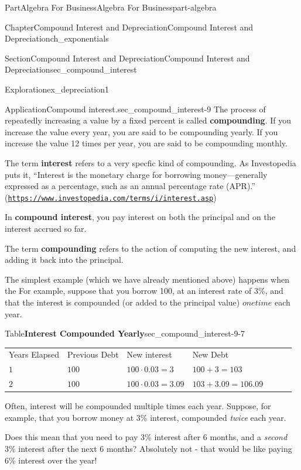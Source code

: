\documentclass[oneside,10pt,]{tufte-book}
\newcommand{\tabularfont}{\relax}
\newcommand{\terminology}[1]{\textbf{#1}}
\numberwithin{equation}{chapter}
\newcommand{\hrulethin}  {\noalign{\hrule height 0.04em}}
\begin{document}
\begin{partptx}{Part}{Algebra For Business}{}{Algebra For Business}{}{}{part-algebra}
\begin{chapterptx}{Chapter}{Compound Interest and Depreciation}{}{Compound Interest and Depreciation}{}{}{ch_exponentials}
\begin{sectionptx}{Section}{Compound Interest and Depreciation}{}{Compound Interest and Depreciation}{}{}{sec_compound_interest}
\begin{exploration}{Exploration}{}{ex_depreciation1}
\begin{enumerate}[font=\bfseries,label=(\alph*),ref=\alph*]
\begin{image}{0.25}{0.5}{0.25}{}
{\begin{tikzpicture}
\end{tikzpicture}
}%
\end{image}%
\end{enumerate}%
\end{exploration}%
\begin{insight}{Application}{Compound interest.}{sec_compound_interest-9}%
The process of repeatedly increasing a value by a fixed percent is called \terminology{compounding}. If you increase the value every year, you are said to be compounding yearly. If you increase the value 12 times per year, you are said to be compounding monthly.%
\par
The term \terminology{interest} refers to a very specfic kind of compounding.  As Investopedia puts it, ``Interest is the monetary charge for borrowing money—generally expressed as a percentage, such as an annual percentage rate (APR).'' (\href{https://www.investopedia.com/terms/i/interest.asp}{\nolinkurl{https://www.investopedia.com/terms/i/interest.asp}})%
\par
In \terminology{compound interest}, you pay interest on both the principal and on the interest accrued so far.%
\par
The term \terminology{compounding} refers to the action of computing the new interest, and adding it back into the principal.%
\par
The simplest example (which we have already mentioned above) happens when the For example, suppose that you borrow \textdollar{}100, at an interest rate of 3\%, and that the interest is compounded (or added to the principal value) \(one time\) each year.%
\begin{tableptx}{Table}{\textbf{Interest Compounded Yearly}}{sec_compound_interest-9-7}{}%
\centering%
{\tabularfont%
\begin{tabular}{lAlAlAl}
Years Elapsed&Previous Debt&New interest&New Debt\tabularnewline\hrulethin
\(1\)&\(100\)&\(100\cdot 0.03=3\)&\(100+3=103\)\tabularnewline\hrulethin
\(2\)&\(100\)&\(100\cdot 0.03=3.09\)&\(103+3.09=106.09\)
\end{tabular}
}%
\end{tableptx}%
Often, interest will be compounded multiple times each year.  Suppose, for example, that you borrow money at 3\% interest, compounded \emph{twice} each year.%
\par
Does this mean that you need to pay 3\% interest after 6 months, and a \emph{second} 3\% interest after the next 6 months? Absolutely not - that would be like paying 6\% interest over the year!%
\par

\end{insight}
\end{sectionptx}
\end{chapterptx}
\end{partptx}
\end{document}
